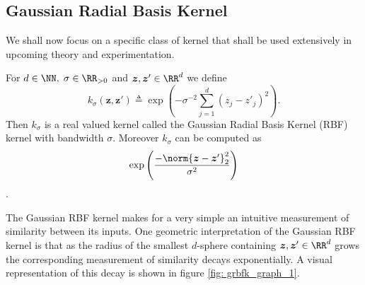 \subsection{Gaussian Radial Basis Kernel}\label{Section1.3}

We shall now focus on a specific class of kernel that shall be used extensively in upcoming theory and experimentation.

\begin{defe} \label{defe: grbfk}
    For $d \in \NN, \; \sigma \in \RR_{>0}$ and $ \bm{z} , \bm{z}' \in \RR^d$ we define
    \[
        k_\sigma \left( \bm{z} , \bm{z}' \right) \triangleq \exp \left( - \sigma^{-2} \sum_{j=1}^{d} \left( {z}_j - {{z}'}_j \right)^2 \right).
    \]
    Then $k_\sigma$ is a real valued kernel called the Gaussian Radial Basis Kernel (RBF) kernel with bandwidth $\sigma$. Moreover $k_\sigma$ can be computed as
    \[
        \exp \left( \frac{- \norm{\bm{z} - {\bm{z}'}}_{2}^{2}}{\sigma^2} \right)
    \]
    \cite{SteinwartIngo2008SVMb}.
\end{defe}
The Gaussian RBF kernel makes for a very simple an intuitive measurement of similarity between its inputs. One geometric interpretation of the Gaussian RBF kernel is that as the radius of the smallest $d$-sphere containing $\bm{z} , \bm{z}' \in \RR^d$ grows the corresponding measurement of similarity decays exponentially. A visual representation of this decay is shown in figure \ref{fig: grbfk_graph_1}.






